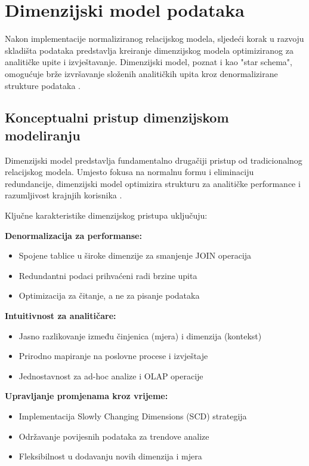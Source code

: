 \section{Dimenzijski model podataka}

Nakon implementacije normaliziranog relacijskog modela, sljedeći korak u razvoju skladišta podataka predstavlja kreiranje dimenzijskog modela optimiziranog za analitičke upite i izvještavanje. Dimenzijski model, poznat i kao "star schema", omogućuje brže izvršavanje složenih analitičkih upita kroz denormalizirane strukture podataka \cite{Kimball2013}.

\subsection{Konceptualni pristup dimenzijskom modeliranju}

Dimenzijski model predstavlja fundamentalno drugačiji pristup od tradicionalnog relacijskog modela. Umjesto fokusa na normalnu formu i eliminaciju redundancije, dimenzijski model optimizira strukturu za analitičke performance i razumljivost krajnjih korisnika \cite{Inmon2005}.

Ključne karakteristike dimenzijskog pristupa uključuju:

\textbf{Denormalizacija za performanse:}
\begin{itemize}
    \item Spojene tablice u široke dimenzije za smanjenje JOIN operacija
    \item Redundantni podaci prihvaćeni radi brzine upita
    \item Optimizacija za čitanje, a ne za pisanje podataka
\end{itemize}

\textbf{Intuitivnost za analitičare:}
\begin{itemize}
    \item Jasno razlikovanje između činjenica (mjera) i dimenzija (kontekst)
    \item Prirodno mapiranje na poslovne procese i izvještaje
    \item Jednostavnost za ad-hoc analize i OLAP operacije
\end{itemize}

\textbf{Upravljanje promjenama kroz vrijeme:}
\begin{itemize}
    \item Implementacija Slowly Changing Dimensions (SCD) strategija
    \item Održavanje povijesnih podataka za trendove analize
    \item Fleksibilnost u dodavanju novih dimenzija i mjera
\end{itemize}

